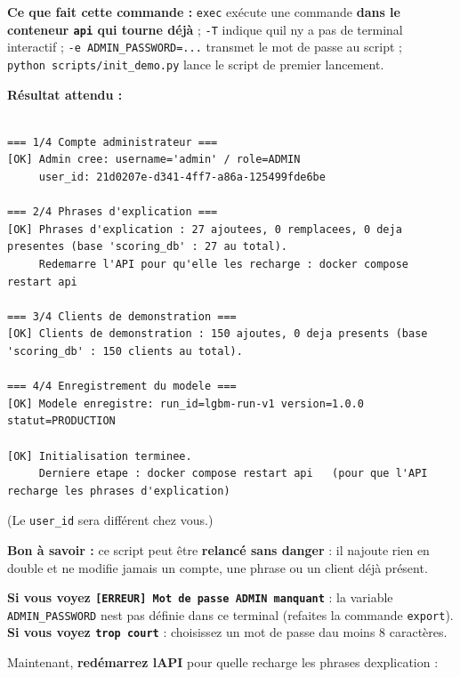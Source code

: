 \documentclass[
  french,
  11pt,
  a4paper,
]{article}
\begin{document}
\textbf{Ce que fait cette commande :} \texttt{exec} exécute une commande
\textbf{dans le conteneur \texttt{api} qui tourne déjà} ; \texttt{-T}
indique qu\textquotesingle il n\textquotesingle y a pas de terminal
interactif ;
\texttt{-\allowbreak{}e\ ADMIN\_\allowbreak{}PASSWORD=\allowbreak{}.\allowbreak{}.\allowbreak{}.\allowbreak{}}
transmet le mot de passe au script ;
\texttt{python\ scripts/\allowbreak{}init\_\allowbreak{}demo.\allowbreak{}py}
lance le script de premier lancement.

\textbf{Résultat attendu :}

\begin{Verbatim}[breaklines=true,breakanywhere=true,fontsize=\small,frame=leftline,framerule=1.6pt,rulecolor=\color{credixblue},framesep=3mm,xleftmargin=2mm,xrightmargin=1mm]

=== 1/4 Compte administrateur ===
[OK] Admin cree: username='admin' / role=ADMIN
     user_id: 21d0207e-d341-4ff7-a86a-125499fde6be

=== 2/4 Phrases d'explication ===
[OK] Phrases d'explication : 27 ajoutees, 0 remplacees, 0 deja presentes (base 'scoring_db' : 27 au total).
     Redemarre l'API pour qu'elle les recharge : docker compose restart api

=== 3/4 Clients de demonstration ===
[OK] Clients de demonstration : 150 ajoutes, 0 deja presents (base 'scoring_db' : 150 clients au total).

=== 4/4 Enregistrement du modele ===
[OK] Modele enregistre: run_id=lgbm-run-v1 version=1.0.0 statut=PRODUCTION

[OK] Initialisation terminee.
     Derniere etape : docker compose restart api   (pour que l'API recharge les phrases d'explication)
\end{Verbatim}

(Le \texttt{user\_id} sera différent chez vous.)

\textbf{Bon à savoir :} ce script peut être \textbf{relancé sans danger}
: il n\textquotesingle ajoute rien en double et ne modifie jamais un
compte, une phrase ou un client déjà présent.

\textbf{Si vous voyez
\texttt{{[}ERREUR{]}\ Mot\ de\ passe\ ADMIN\ manquant}} : la variable
\texttt{ADMIN\_PASSWORD} n\textquotesingle est pas définie dans ce
terminal (refaites la commande \texttt{export}). \textbf{Si vous voyez
\texttt{trop\ court}} : choisissez un mot de passe d\textquotesingle au
moins 8 caractères.

Maintenant, \textbf{redémarrez l\textquotesingle API} pour
qu\textquotesingle elle recharge les phrases
d\textquotesingle explication :
\end{document}
